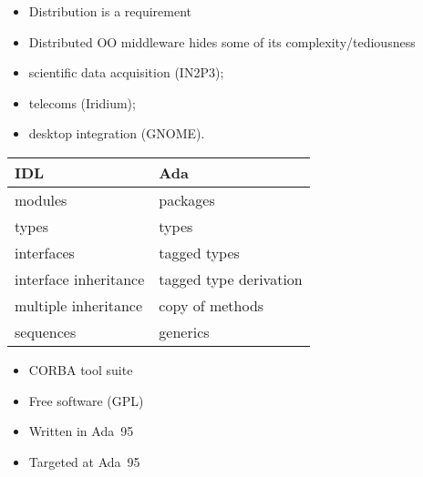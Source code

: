 \documentclass[a4,slidesec]{seminar}
\newcommand{\ab}{AdaBroker}
\newcommand{\ada}{Ada~95}
\begin{document}
\begin{slide}

\begin{itemize}
\item Distribution is a requirement
\item Distributed OO middleware hides some of its complexity/tediousness
\end{itemize}

\begin{itemize}
\item scientific data acquisition (IN2P3);
\item telecoms (Iridium);
\item desktop integration (GNOME).
\end{itemize}
\end{slide}

\begin{slide}


\centering
\begin{tabular}{l|l}
\textbf{IDL} & \textbf{Ada} \\ \hline
modules & packages \\
types & types \\
interfaces & tagged types \\
interface inheritance & tagged type derivation \\ \hline
multiple inheritance & copy of methods \\ \hline
sequences & generics
\end{tabular}

\end{slide}

\begin{slide}
\slideheading{\ab}

\begin{itemize}
\item CORBA tool suite
\item Free software (GPL)
\item Written in \ada{}
\item Targeted at \ada{}
\end{itemize}
\end{slide}
\end{document}
